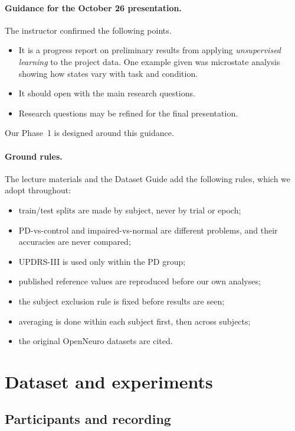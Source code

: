 \documentclass[11pt,a4paper]{article}
\begin{document}
\paragraph{Guidance for the October 26 presentation.} The instructor confirmed the following points.
\begin{itemize}
  \item It is a progress report on preliminary results from applying \emph{unsupervised learning} to the project data. One example given was microstate analysis showing how states vary with task and condition.
  \item It should open with the main research questions.
  \item Research questions may be refined for the final presentation.
\end{itemize}
Our Phase~1 is designed around this guidance.

\paragraph{Ground rules.} The lecture materials and the Dataset Guide add the following rules, which we adopt throughout:
\begin{itemize}
  \item train/test splits are made by subject, never by trial or epoch;
  \item PD-vs-control and impaired-vs-normal are different problems, and their accuracies are never compared;
  \item UPDRS-III is used only within the PD group;
  \item published reference values are reproduced before our own analyses;
  \item the subject exclusion rule is fixed before results are seen;
  \item averaging is done within each subject first, then across subjects;
  \item the original OpenNeuro datasets are cited.
\end{itemize}

\section{Dataset and experiments}

\subsection{Participants and recording}
\end{document}
